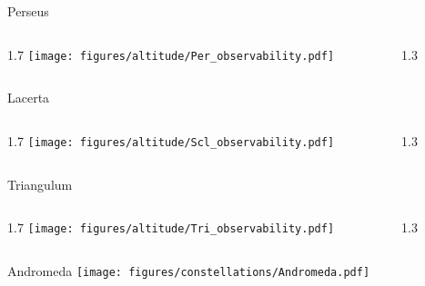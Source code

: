 \documentclass[final]{beamer}
\newlength{\colwidth}
\begin{document}
\begin{frame}[t]{}
    \Large{Perseus}
    \begin{columns}[T]
        \begin{column}{1.7\colwidth}
            \centering
            \texttt{[image: figures/altitude/Per\_observability.pdf]}
        \end{column}
        \begin{column}{1.3\colwidth}
            \Large
            
        \end{column}
    \end{columns}

    \Large{Lacerta}
    \begin{columns}[T]
        \begin{column}{1.7\colwidth}
            \centering
            \texttt{[image: figures/altitude/Scl\_observability.pdf]}
        \end{column}
        \begin{column}{1.3\colwidth}
            \Large
            
        \end{column}
    \end{columns}

    \Large{Triangulum}
    \begin{columns}[T]
        \begin{column}{1.7\colwidth}
            \centering
            \texttt{[image: figures/altitude/Tri\_observability.pdf]}
        \end{column}
        \begin{column}{1.3\colwidth}
            \Large
            
        \end{column}
    \end{columns}
\end{frame}


\begin{frame}[t]{\LARGE Andromeda}
    \centering
    \texttt{[image: figures/constellations/Andromeda.pdf]}
\end{frame}

\end{document}
